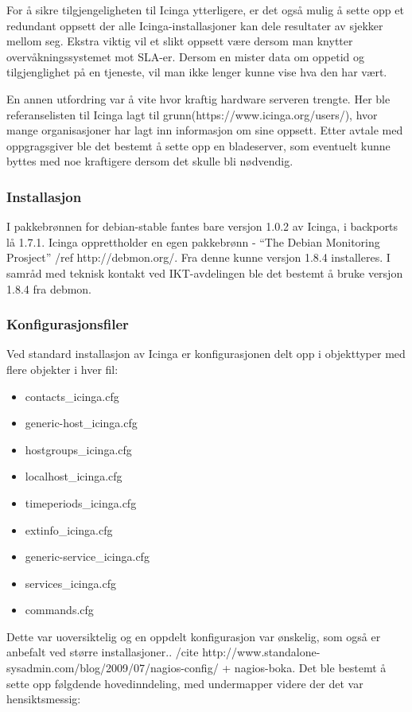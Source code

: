 For å sikre tilgjengeligheten til Icinga ytterligere, er det også mulig å sette opp et redundant oppsett der alle Icinga-installasjoner kan dele resultater av sjekker mellom seg. Ekstra viktig vil et slikt oppsett være dersom man knytter overvåkningssystemet mot SLA-er. Dersom en mister data om oppetid og tilgjenglighet på en tjeneste, vil man ikke lenger kunne vise hva den har vært.

En annen utfordring var å vite hvor kraftig hardware serveren trengte. Her ble referanselisten til Icinga lagt til grunn(https://www.icinga.org/users/), hvor mange organisasjoner har lagt inn informasjon om sine oppsett. Etter avtale med oppgragsgiver ble det bestemt å sette opp en bladeserver, som eventuelt kunne byttes med noe kraftigere dersom det skulle bli nødvendig. 

\subsubsection{Installasjon}
I pakkebrønnen for debian-stable fantes bare versjon 1.0.2 av Icinga, i backports lå 1.7.1. Icinga opprettholder en egen pakkebrønn - “The Debian Monitoring Prosject” /ref http://debmon.org/. Fra denne kunne versjon 1.8.4 installeres. I samråd med teknisk kontakt ved IKT-avdelingen ble det bestemt å bruke versjon 1.8.4 fra debmon.

\subsubsection{Konfigurasjonsfiler}
Ved standard installasjon av Icinga er konfigurasjonen delt opp i objekttyper med flere objekter i hver fil:
\begin{itemize}
\item contacts\_icinga.cfg  
\item generic-host\_icinga.cfg     
\item hostgroups\_icinga.cfg  
\item localhost\_icinga.cfg  
\item timeperiods\_icinga.cfg
\item extinfo\_icinga.cfg   
\item generic-service\_icinga.cfg   
\item services\_icinga.cfg
\item commands.cfg
\end{itemize}
Dette var uoversiktelig og en oppdelt konfigurasjon var ønskelig, som også er anbefalt ved større installasjoner.. /cite http://www.standalone-sysadmin.com/blog/2009/07/nagios-config/ + nagios-boka. Det ble bestemt å sette opp følgdende hovedinndeling, med undermapper videre der det var hensiktsmessig:

